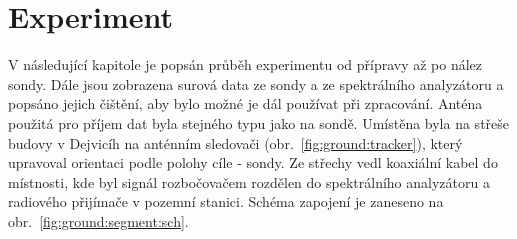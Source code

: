 \documentclass[twoside]{ctuthesis}
\theoremstyle{plain}
\theoremstyle{definition}
\theoremstyle{note}
\begin{document}
	

	




















	

	

\chapter{Experiment}
\label{chap:expoeriment}
	V následující kapitole je popsán průběh experimentu od přípravy až po nález sondy. Dále jsou zobrazena surová data ze sondy a ze spektrálního analyzátoru a popsáno jejich čištění, aby bylo možné je dál používat při zpracování. Anténa použitá pro příjem dat byla stejného typu jako na sondě. Umístěna byla na střeše budovy v Dejvicíh na anténním sledovači (obr.~\ref{fig:ground:tracker}), který upravoval orientaci podle polohy cíle - sondy. Ze střechy vedl koaxiální kabel do místnosti, kde byl signál rozbočovačem rozdělen do spektrálního analyzátoru a radiového přijímače v pozemní stanici. Schéma zapojení je zaneseno na obr.~\ref{fig:ground:segment:sch}.
\end{document}
